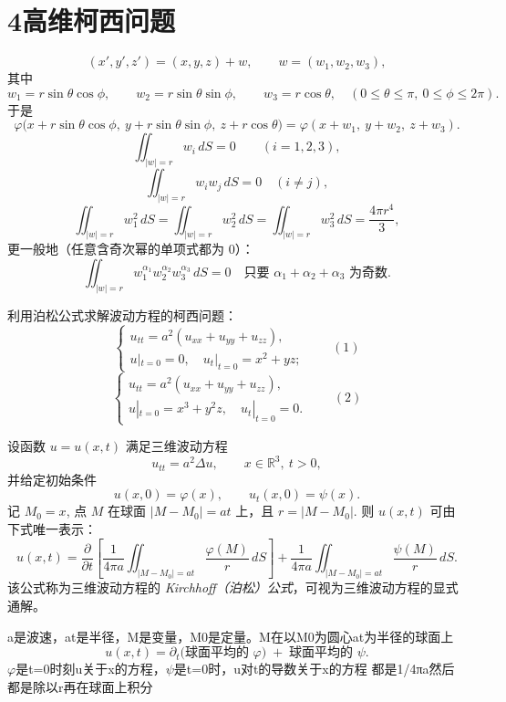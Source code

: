 \section{4高维柯西问题}
\[
(x',y',z')=(x,y,z)+w,\qquad w=(w_1,w_2,w_3),
\]
其中
\[
w_1=r\sin\theta\cos\phi,\qquad
w_2=r\sin\theta\sin\phi,\qquad
w_3=r\cos\theta,
\quad (0\le \theta\le \pi,\ 0\le \phi\le 2\pi).
\]
于是
\[
\varphi\bigl(x+r\sin\theta\cos\phi,\ y+r\sin\theta\sin\phi,\ z+r\cos\theta\bigr)
=\varphi(x+w_1,\ y+w_2,\ z+w_3).
\]
\[
\iint_{|w|=r} w_i\,dS=0 \qquad (i=1,2,3),
\]
\[
\iint_{|w|=r} w_iw_j\,dS=0 \quad (i\ne j),
\]
\[
\iint_{|w|=r} w_1^2\,dS=\iint_{|w|=r} w_2^2\,dS=\iint_{|w|=r} w_3^2\,dS
=\frac{4\pi r^4}{3},
\]
更一般地（任意含奇次幂的单项式都为 0）：
\[
\iint_{|w|=r} w_1^{\alpha_1}w_2^{\alpha_2}w_3^{\alpha_3}\,dS=0
\quad\text{只要 }\alpha_1+\alpha_2+\alpha_3\text{ 为奇数}.
\]
\begin{homework}[1]
    

利用泊松公式求解波动方程的柯西问题：
\[
\begin{cases}
u_{tt} = a^{2}(u_{xx} + u_{yy} + u_{zz}),\\[4pt]
u|_{t=0} = 0,\quad u_t|_{t=0} = x^{2} + yz;
\end{cases}
\qquad (1)
\]
\[
\begin{cases}
u_{tt} = a^{2}(u_{xx} + u_{yy} + u_{zz}),\\[4pt]
u|_{t=0} = x^{3} + y^{2}z,\quad u_t|_{t=0} = 0.
\end{cases}
\qquad (2)
\]
\end{homework}
\begin{definition}
设函数 $u=u(x,t)$ 满足三维波动方程
\[
u_{tt}=a^{2}\Delta u,\qquad x\in\mathbb{R}^{3},\ t>0,
\]
并给定初始条件
\[
u(x,0)=\varphi(x),\qquad u_t(x,0)=\psi(x).
\]
记 $M_0=x$, 点 $M$ 在球面 
\(
|M-M_0|=at
\)
上，且
\(
r=|M-M_0|.
\)
则 $u(x,t)$ 可由下式唯一表示：
\[
u(x,t)
=
\frac{\partial}{\partial t}
\left[
\frac{1}{4\pi a}
\iint_{|M-M_0|=at}
\frac{\varphi(M)}{r}\, dS
\right]
+
\frac{1}{4\pi a}
\iint_{|M-M_0|=at}
\frac{\psi(M)}{r}\, dS.
\]
该公式称为三维波动方程的 \emph{Kirchhoff（泊松）公式}，可视为三维波动方程的显式通解。
\end{definition}
\begin{dxtips}
    a是波速，at是半径，M是变量，M0是定量。M在以M0为圆心at为半径的球面上\[
u(x,t)
=\partial_t\!\bigl(\text{球面平均的 }\varphi\bigr)
\;+\;
\text{球面平均的 }\psi .
\]
$\varphi$是t=0时刻u关于x的方程，$\psi$是t=0时，u对t的导数关于x的方程
都是1/4πa然后都是除以r再在球面上积分
\end{dxtips}
